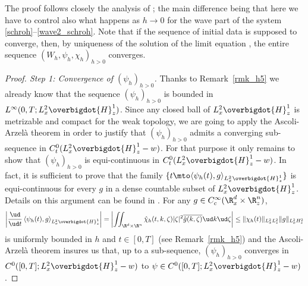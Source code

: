 The proof follows closely the analysis of \cite{Lions_Paul_Wigner};
the main difference being that here we have to control also what happens as $h\to 0$ for the wave part of the system \eqref{schroh}--\eqref{wave2_schroh}.
Note that if the sequence of initial data is supposed to converge, then, by uniqueness of the solution of the limit equation \cite[Th.\,4]{dBGV}, the entire sequence
$(W_{h}, \psi_{h},\chi_{h})_{h>0}$ converges.

\begin{proof}[Proof. Step 1: Convergence of $(\psi_{h})_{h>0}$]
Thanks to Remark~\ref{rmk_h5} we already know that the sequence $(\psi_{h})_{h>0}$ is bounded in $L^{\infty}(0,T;L_{x}^{2}\overbigdot{H}_{z}^{1})$. Since any closed ball of $L_{x}^{2}\overbigdot{H}_{z}^{1}$ is metrizable and compact for the weak topology, we are going to apply the Ascoli-Arzelà theorem in order to justify that $(\psi_{h})_{h>0}$ admits a converging sub-sequence in $C_{t}^{0}(L_{x}^{2}\overbigdot{H}_{z}^{1}-w)$. For that purpose it only remains to show that $(\psi_{h})_{h>0}$ is equi-continuous in $C_{t}^{0}(L_{x}^{2}\overbigdot{H}_{z}^{1}-w)$. In fact, it is sufficient to prove that the family $\{t\mto \langle \psi_{h}(t),g\rangle_{L_{x}^{2}\overbigdot{H}_{z}^{1}}\}$ is equi-continuous for every $g$ in a dense countable subset of $L_{x}^{2}\overbigdot{H}_{z}^{1}$. Details on this argument can be found \eg in \cite[App.\,C]{PLL}.
For any $g\in C_{c}^{\infty}(\R_{x}^{d}\times\R_{z}^{n})$,
\[
\left|\frac{\ud}{\ud t}\left\langle\psi_{h}(t),g\right\rangle_{L_{x}^{2}\overbigdot{H}_{z}^{1}}\right|=\left|\iint_{\R^{d}\times\R^{n}}\hat{\chi}_{h}(t,k,\zeta)|\zeta|^{2}\overline{\hat{g}(k,\zeta)}\ud k\ud\zeta\right|\leq\|\chi_{h}(t)\|_{L_{x}^{2}L_{z}^{2}}\|g\|_{L_{x}^{2}H_{z}^{2}}
\]
is uniformly bounded in $h$ and $t\in[0,T]$ (see Remark~\ref{rmk_h5}) and the Ascoli-Arzelà theorem insures us that, up to a sub-sequence, $(\psi_{h})_{h>0}$ converges in \hbox{$C^{0}([0,T];L_{x}^{2}\overbigdot{H}_{z}^{1}-w)$} to $\psi\in C^{0}([0,T];L_{x}^{2}\overbigdot{H}_{z}^{1}-w)$.


\end{proof}
